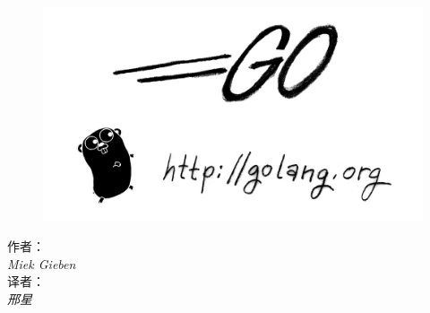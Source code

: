 \documentclass[twoside,openleft]{blocksbook}
\begin{document}
\begin{cjkc}
\thispagestyle{empty}
\newcommand{\version}{0.5}
\begin{center}
\end{center}
\vspace*{0.5cm}
\begin{figure}[h!]
\begin{center}
    \includegraphics[scale=0.3]{fig/bumper-inverse.png}
\end{center}
\end{figure}
\vspace*{0.02\stockheight}
\begin{minipage}{0.4\textwidth}
\begin{flushleft} \large
\hspace*{1.0cm}作者：\\
\hspace*{1.0cm}\emph{Miek Gieben}\\
\hspace*{1.0cm}译者：\\
\hspace*{1.0cm}\emph{邢星}\\
\vfill
\end{flushleft}
\end{minipage}
\hspace{5mm}
\begin{minipage}{0.4\textwidth}
\begin{flushright} \large

\end{flushright}
\end{minipage}
\end{cjkc}
\end{document}
